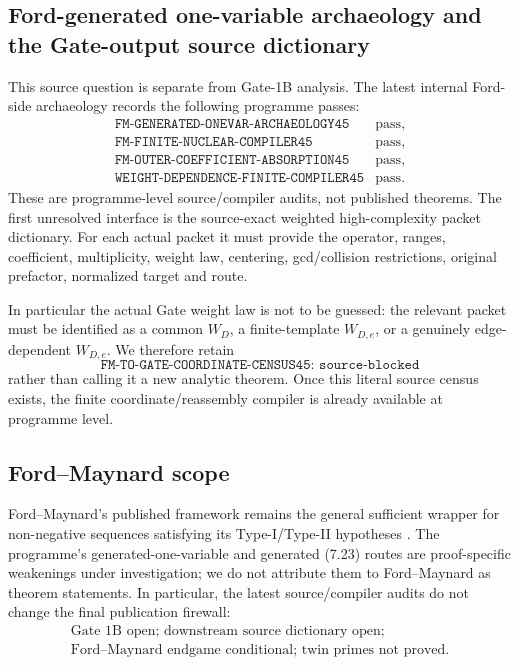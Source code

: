 \documentclass[11pt]{article}
\theoremstyle{definition}
\newcommand{\1}{\mathbf 1}
\begin{document}
\subsection{Ford-generated one-variable archaeology and the Gate-output source dictionary}
This source question is separate from Gate-1B analysis.  The latest internal
Ford-side archaeology records the following programme passes:
\[
\begin{array}{ll}
 \texttt{FM-GENERATED-ONEVAR-ARCHAEOLOGY45} & \text{pass},\\
 \texttt{FM-FINITE-NUCLEAR-COMPILER45} & \text{pass},\\
 \texttt{FM-OUTER-COEFFICIENT-ABSORPTION45} & \text{pass},\\
 \texttt{WEIGHT-DEPENDENCE-FINITE-COMPILER45} & \text{pass}.
\end{array}
\]
These are programme-level source/compiler audits, not published theorems.
The first unresolved interface is the source-exact weighted high-complexity
packet dictionary.  For each actual packet it must provide the operator,
ranges, coefficient, multiplicity, weight law, centering, gcd/collision
restrictions, original prefactor, normalized target and route.

In particular the actual Gate weight law is not to be guessed: the relevant
packet must be identified as a common $W_D$, a finite-template
$W_{D,e}$, or a genuinely edge-dependent $W_{D,e}$.  We therefore retain
\[
   \boxed{\texttt{FM-TO-GATE-COORDINATE-CENSUS45: source-blocked}}
\]
rather than calling it a new analytic theorem.  Once this literal source
census exists, the finite coordinate/reassembly compiler is already available
at programme level.

\subsection{Ford--Maynard scope}
Ford--Maynard's published framework remains the general sufficient wrapper for
non-negative sequences satisfying its Type-I/Type-II hypotheses
\cite{FordMaynard2024}.  The programme's generated-one-variable and generated
(7.23) routes are proof-specific weakenings under investigation; we do not
attribute them to Ford--Maynard as theorem statements.  In particular, the
latest source/compiler audits do not change the final publication firewall:
\[
 \boxed{\begin{gathered}
   \text{Gate 1B open; downstream source dictionary open;}\\
   \text{Ford--Maynard endgame conditional; twin primes not proved.}
 \end{gathered}}
\]
\end{document}
